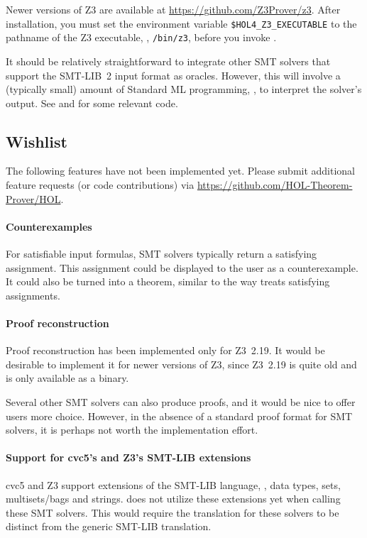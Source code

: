 Newer versions of Z3 are available at
\url{https://github.com/Z3Prover/z3}. After installation, you must set
the environment variable {\tt \$HOL4\_Z3\_EXECUTABLE} to the pathname
of the Z3 executable, \eg, {\tt /bin/z3}, before you invoke \HOL.

It should be relatively straightforward to integrate other SMT solvers
that support the SMT-LIB~2 input format as oracles.  However, this
will involve a (typically small) amount of Standard ML programming,
\eg, to interpret the solver's output.  See  and
 for some relevant code.

\subsection{Wishlist}

The following features have not been implemented yet.  Please submit
additional feature requests (or code contributions) via
\url{https://github.com/HOL-Theorem-Prover/HOL}.

\paragraph{Counterexamples}

For satisfiable input formulas, SMT solvers typically return a
satisfying assignment.  This assignment could be displayed to the
\HOL{} user as a counterexample.  It could also be turned into a
theorem, similar to the way  treats satisfying
assignments.

\paragraph{Proof reconstruction}

Proof reconstruction has been implemented only for Z3~2.19. It would
be desirable to implement it for newer versions of Z3, since Z3~2.19
is quite old and is only available as a binary.

Several other SMT solvers can also produce proofs, and it would be
nice to offer \HOL{} users more choice.  However, in the absence of a
standard proof format for SMT solvers, it is perhaps not worth the
implementation effort.

\paragraph{Support for cvc5's and Z3's SMT-LIB extensions}

cvc5 and Z3 support extensions of the SMT-LIB language, \eg, data
types, sets, multisets/bags and strings.  does not
utilize these extensions yet when calling these SMT solvers. This
would require the translation for these solvers to be distinct from
the generic SMT-LIB translation.


